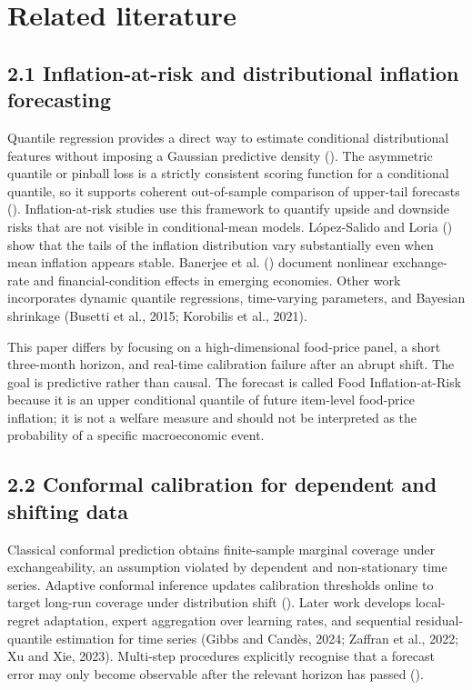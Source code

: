 \section{Related literature}\label{related-literature}

\subsection{2.1 Inflation-at-risk and distributional inflation
forecasting}\label{inflation-at-risk-and-distributional-inflation-forecasting}

Quantile regression provides a direct way to estimate conditional
distributional features without imposing a Gaussian predictive density
(). The
asymmetric quantile or pinball loss is a strictly consistent scoring
function for a conditional quantile, so it supports coherent
out-of-sample comparison of upper-tail forecasts
().
Inflation-at-risk studies use this framework to quantify upside and
downside risks that are not visible in conditional-mean models.
López-Salido and Loria ()
show that the tails of the inflation distribution vary substantially
even when mean inflation appears stable. Banerjee et al.
() document nonlinear
exchange-rate and financial-condition effects in emerging economies.
Other work incorporates dynamic quantile regressions, time-varying
parameters, and Bayesian shrinkage (Busetti et al., 2015; Korobilis et
al., 2021).

This paper differs by focusing on a high-dimensional food-price panel, a
short three-month horizon, and real-time calibration failure after an
abrupt shift. The goal is predictive rather than causal. The forecast is
called Food Inflation-at-Risk because it is an upper conditional
quantile of future item-level food-price inflation; it is not a welfare
measure and should not be interpreted as the probability of a specific
macroeconomic event.

\subsection{2.2 Conformal calibration for dependent and shifting
data}\label{conformal-calibration-for-dependent-and-shifting-data}

Classical conformal prediction obtains finite-sample marginal coverage
under exchangeability, an assumption violated by dependent and
non-stationary time series. Adaptive conformal inference updates
calibration thresholds online to target long-run coverage under
distribution shift (). Later work develops local-regret adaptation, expert aggregation
over learning rates, and sequential residual-quantile estimation for
time series (Gibbs and Candès, 2024; Zaffran et al., 2022; Xu and Xie,
2023). Multi-step procedures explicitly recognise that a forecast error
may only become observable after the relevant horizon has passed
().

